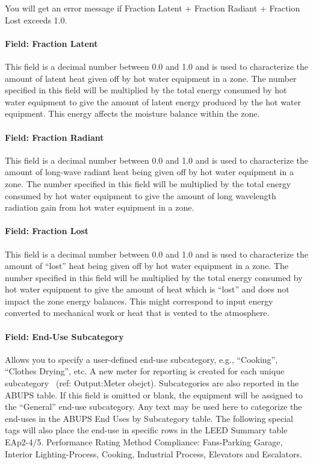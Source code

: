 You will get an error message if Fraction Latent + Fraction Radiant + Fraction Lost exceeds 1.0.

\paragraph{Field: Fraction Latent}\label{field-fraction-latent-2}

This field is a decimal number between 0.0 and 1.0 and is used to characterize the amount of latent heat given off by hot water equipment in a zone. The number specified in this field will be multiplied by the total energy consumed by hot water equipment to give the amount of latent energy produced by the hot water equipment. This energy affects the moisture balance within the zone.

\paragraph{Field: Fraction Radiant}\label{field-fraction-radiant-4}

This field is a decimal number between 0.0 and 1.0 and is used to characterize the amount of long-wave radiant heat being given off by hot water equipment in a zone. The number specified in this field will be multiplied by the total energy consumed by hot water equipment to give the amount of long wavelength radiation gain from hot water equipment in a zone.

\paragraph{Field: Fraction Lost}\label{field-fraction-lost-2}

This field is a decimal number between 0.0 and 1.0 and is used to characterize the amount of ``lost'' heat being given off by hot water equipment in a zone. The number specified in this field will be multiplied by the total energy consumed by hot water equipment to give the amount of heat which is ``lost'' and does not impact the zone energy balances. This might correspond to input energy converted to mechanical work or heat that is vented to the atmosphere.

\paragraph{Field: End-Use Subcategory}\label{field-end-use-subcategory-3-000}

Allows you to specify a user-defined end-use subcategory, e.g., ``Cooking'', ``Clothes Drying'', etc. A new meter for reporting is created for each unique subcategory~ (ref: Output:Meter obejct). Subcategories are also reported in the ABUPS table. If this field is omitted or blank, the equipment will be assigned to the ``General'' end-use subcategory. Any text may be used here to categorize the end-uses in the ABUPS End Uses by Subcategory table. The following special tags will also place the end-use in specific rows in the LEED Summary table EAp2-4/5. Performance Rating Method Compliance:  Fans-Parking Garage, Interior Lighting-Process, Cooking, Industrial Process, Elevators and Escalators.

